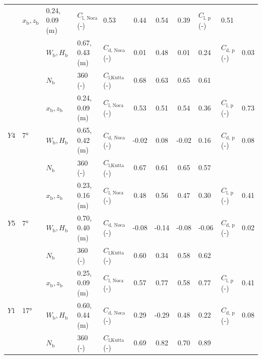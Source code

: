 \documentclass[wes, manuscript]{copernicus}
\begin{document}
\begin{table}[H]
\begin{tabular}{p{0.5cm} p{0.8cm} p{.8cm} p{2.6cm} p{1.8cm} c c c p{1cm} p{1.3cm} c}
    & $x_{\textrm{b}},z_{\textrm{b}}$ & 0.24, 0.09 (\unit{m}) & $C_{\textrm{l, Noca}}$ (\unit{-})& 0.53 & 0.44 & 0.54 & 0.39 & $C_{\textrm{l, p}}$ (\unit{-})& 0.51 \\
    & & $W_{\textrm{b}}, H_{\textrm{b}}$ & 0.67, 0.43 (\unit{m}) & $C_{\textrm{d, Noca}}$ (\unit{-})& 0.01 & 0.48 & 0.01 & 0.24 & $C_{\textrm{d, p}}$ (\unit{-})& 0.03 \\
    & & $N_{\textrm{b}}$ & 360 (\unit{-}) & $C_{\textrm{l,Kutta}}$ (\unit{-})& 0.68 & 0.63 & 0.65 & 0.61 & & \\
    \hline
    \multirow{3}{*}{$Y4$} & \multirow{3}{*}{7\unit{\degree}}
    & $x_{\textrm{b}},z_{\textrm{b}}$ & 0.24, 0.09 (\unit{m}) & $C_{\textrm{l, Noca}}$ (\unit{-})& 0.53 & 0.51 & 0.54 & 0.36 & $C_{\textrm{l, p}}$ (\unit{-})& 0.73 \\
    & & $W_{\textrm{b}}, H_{\textrm{b}}$ & 0.65, 0.42 (\unit{m}) & $C_{\textrm{d, Noca}}$ (\unit{-})& -0.02 & 0.08 & -0.02 & 0.16 & $C_{\textrm{d, p}}$ (\unit{-})& 0.08 \\
    & & $N_{\textrm{b}}$ & 360 (\unit{-}) & $C_{\textrm{l,Kutta}}$ (\unit{-})& 0.67 & 0.61 & 0.65 & 0.57 & & \\
    \hline
    \multirow{3}{*}{$Y5$} & \multirow{3}{*}{7\unit{\degree}}
    & $x_{\textrm{b}},z_{\textrm{b}}$ & 0.23, 0.16 (\unit{m}) & $C_{\textrm{l, Noca}}$ (\unit{-})& 0.48 & 0.56 & 0.47 & 0.30 & $C_{\textrm{l, p}}$ (\unit{-})& 0.41 \\
    & & $W_{\textrm{b}}, H_{\textrm{b}}$ & 0.70, 0.40 (\unit{m}) & $C_{\textrm{d, Noca}}$ (\unit{-})& -0.08 & -0.14 & -0.08 & -0.06 & $C_{\textrm{d, p}}$ (\unit{-})& 0.02 \\
    & & $N_{\textrm{b}}$ & 360 (\unit{-}) & $C_{\textrm{l,Kutta}}$ (\unit{-})& 0.60 & 0.34 & 0.58 & 0.62 & & \\
    \hline
    \multirow{3}{*}{$Y1$} & \multirow{3}{*}{17\unit{\degree}}
    & $x_{\textrm{b}},z_{\textrm{b}}$ & 0.25, 0.09 (\unit{m}) & $C_{\textrm{l, Noca}}$ (\unit{-})& 0.57 & 0.77 & 0.58 & 0.77 & $C_{\textrm{l, p}}$ (\unit{-})& 0.41 \\
    & & $W_{\textrm{b}}, H_{\textrm{b}}$ & 0.60, 0.44 (\unit{m}) & $C_{\textrm{d, Noca}}$ (\unit{-})& 0.29 & -0.29 & 0.48 & 0.22 & $C_{\textrm{d, p}}$ (\unit{-})& 0.08 \\
    & & $N_{\textrm{b}}$ & 360 (\unit{-}) & $C_{\textrm{l,Kutta}}$ (\unit{-})& 0.69 & 0.82 & 0.70 & 0.89 & & \\
    \hline
    \end{tabular}
    \label{tab:quantitative_results}
\end{table}
\end{document}
